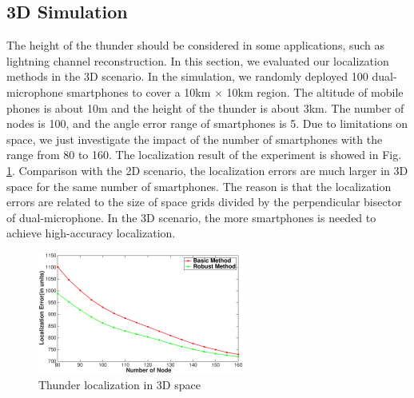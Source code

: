 





  \vspace{-4mm}
\subsection{3D Simulation}

The height of the thunder should be considered in some applications, such as lightning channel reconstruction. 
In this section, we evaluated our localization methods in the 3D scenario.  
In the simulation, we randomly deployed 100 dual-microphone smartphones to cover a 10km $\times$ 10km region. 
The altitude of mobile phones is about 10m and the height of the thunder is about 3km. 
The number of nodes is 100, and the angle error range of smartphones is 5.
Due to limitations on space, we just investigate the impact of the number of smartphones with the range from 80 to 160. 
The localization result of the experiment is showed in Fig. \ref{3D}.
Comparison with the 2D scenario, the localization errors are much larger in 3D space for the same number of smartphones. 
The reason is that the localization errors are related to the size of space grids divided by the perpendicular bisector of dual-microphone.
In the 3D scenario, the more smartphones is needed to achieve high-accuracy localization. 
  \begin{figure}[ht]%
            \setlength{\abovecaptionskip}{0pt}
            \centering
            \includegraphics[scale=1.4,height=4.0cm]{image/3D.eps}
     \vspace{2mm}
    	   \caption{Thunder localization in 3D space}
            \label{3D}
            \vspace{-6mm}
  \end{figure}
  
